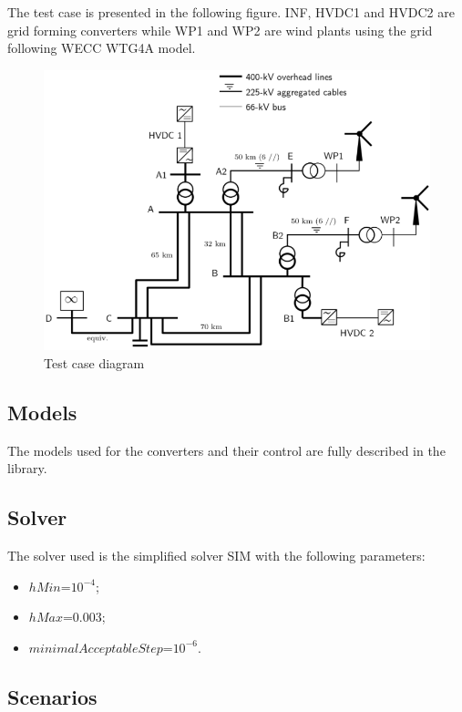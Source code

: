 \documentclass[a4paper, 12pt]{report}
\begin{document}
\par The test case is presented in the following figure. INF, HVDC1 and HVDC2 are grid forming converters while WP1 and WP2 are wind plants using the grid following WECC WTG4A model.

\begin{figure}[H]
  \includegraphics[width=\textwidth]{GFMGFL.png}
  \caption{Test case diagram}
\end{figure}

\subsection{Models}

\par The models used for the converters and their control are fully described in the \Dynawo library.

\subsection{Solver}

\par The solver used is the simplified solver SIM with the following parameters:

\begin{itemize}
\item $hMin$=$10^{-4}$;
\item $hMax$=$0.003$;
\item $minimalAcceptableStep$=$10^{-6}$.
\end{itemize}

\subsection{Scenarios}
\end{document}
